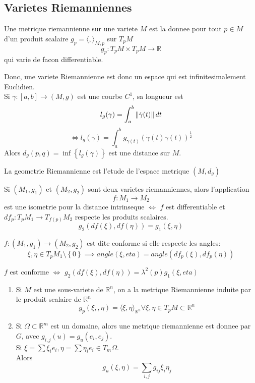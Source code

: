 \documentclass[../main.tex]{subfiles}
\begin{document}
\subsection*{Varietes Riemanniennes}
\begin{defn}	
	Une metrique riemannienne sur une variete $M$ est la donnee pour tout $p\in M$ d'un produit scalaire $g_p = \langle , \rangle_{M,p} $ sur $T_pM$ 
	\[ 
	g_p: T_pM \times T_pM \to \mathbb{R}
	\]
	qui varie de facon differentiable.
\end{defn}
Donc, une variete Riemannienne est donc un espace qui est infinitesimalement Euclidien.\\
Si $\gamma: [ a,b] \to ( M,g) $ est une courbe $C^{1}$, sa longueur est 
\[ 
l_g( \gamma) = \int_{ a }^{ b } \left\lVert \dot\gamma( t) \right\rVert dt
\]
\[ 
\iff l_g( \gamma) = \int_{ a }^{ b } g_{\gamma( t) } ( \dot\gamma( t)  \dot\gamma( t))^{\frac{1}{2}} 
\]
Alors $d_g( p,q) = \inf \left\{ l_{g}( \gamma)   \right\} $ est une distance sur $M$.\\
\begin{defn}
	La geometrie Riemannienne est l'etude de l'espace metrique $ ( M, d_g) $ 	 
\end{defn}
\begin{thm}
	Si $ ( M_1,g_1) $ et $ ( M_2,g_2) $ sont deux varietes riemanniennes, alors l'application
	\[ 
	f:M_1\to M_2
	\]
est une isometrie pour la distance intrinseque $\iff$ $f$ est differentiable et $df_p: T_pM_1\to T_{f( p) } M_2$ respecte les produits scalaires.
\[ 
g_2( df( \xi), df( \eta) ) = g_1( \xi, \eta) 
\]

\end{thm}
\begin{defn}
	$f: ( M_1,g_1) \to ( M_2,g_2) $ est dite conforme si elle respecte les angles:
	\[ 
	\xi, \eta\in T_p M_1 \setminus \left\{ 0 \right\} \implies angle( \xi,eta) = angle ( df_p( \xi) , df_p( \eta) ) 
	\]
	
\end{defn}
\begin{lemma}
	$f$ est conforme $\iff$ $g_2( df( \xi) , df( \eta) ) = \lambda^{2}( p) g_1( \xi, eta) $ 
\end{lemma}
\begin{exemple}
\begin{enumerate}
\item Si $M$ est une sous-variete de $ \mathbb{R}^n$, on a la metrique Riemannienne induite par le produit scalaire de $ \mathbb{R}^n$ 
	\[ 
	g_p( \xi,, \eta) = \langle \xi, \eta\rangle_{ \mathbb{R}^n} \forall \xi, \eta \in T_pM \subset \mathbb{R}^n
	\]

\item Si $\Omega \subset \mathbb{R}^m$ est un domaine, alors une metrique riemannienne est donnee par $G$, avec $g_{i,j} ( u) = g_u( e_i, e_j) $.\\
	Si $\xi= \sum \xi_i e_i, \eta= \sum \eta_i e_i\in T_m \Omega $.\\
	Alors
	\[ 
	g_u( \xi,\eta) = \sum_{i,j}  g_{ij} \xi_i \eta_j
	\]
	
\end{enumerate}
\end{exemple}
\end{document}

